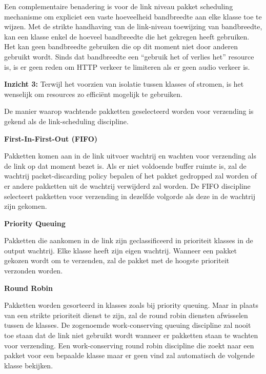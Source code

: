 \newpage

\noindent Een complementaire benadering is voor de link niveau pakket scheduling mechanisme om expliciet een vaste hoeveelheid bandbreedte aan elke klasse toe te wijzen. Met de strikte handhaving van de link-niveau toewijzing van bandbreedte, kan een klasse enkel de hoeveel bandbreedte die het gekregen heeft gebruiken. Het kan geen bandbreedte gebruiken die op dit moment niet door anderen gebruikt wordt. Sinds dat bandbreedte een “gebruik het of verlies het” resource is, is er geen reden om HTTP verkeer te limiteren als er geen audio verkeer is.

\noindent \textbf{Inzicht 3:} Terwijl het voorzien van isolatie tussen klasses of stromen, is het wenselijk om resources zo efficiënt mogelijk te gebruiken.


\noindent De manier waarop wachtende pakketten geselecteerd worden voor verzending is gekend als de link-scheduling discipline.

\noindent \textbf{First-In-First-Out (FIFO)}

\noindent Pakketten komen aan in de link uitvoer wachtrij en wachten voor verzending als de link op dat moment bezet is. Als er niet voldoende buffer ruimte is, zal de wachtrij packet-discarding policy bepalen of het pakket gedropped zal worden of er andere pakketten uit de wachtrij verwijderd zal worden.
De FIFO discipline selecteert pakketten voor verzending in dezelfde volgorde als deze in de wachtrij zijn gekomen.

\noindent \textbf{Priority Queuing}

\noindent Pakketten die aankomen in de link zijn geclassificeerd in prioriteit klasses in de output wachtrij. Elke klasse heeft zijn eigen wachtrij. Wanneer een pakket gekozen wordt om te verzenden, zal de pakket met de hoogste prioriteit verzonden worden.

\noindent \textbf{Round Robin}

\noindent Pakketten worden gesorteerd in klasses zoals bij priority queuing. Maar in plaats van een strikte prioriteit dienst te zijn, zal de round robin diensten afwisselen tussen de klasses. De zogenoemde work-conserving queuing discipline zal nooit toe staan dat de link niet gebruikt wordt wanneer er pakketten staan te wachten voor verzending. Een work-conserving round robin discipline die zoekt naar een pakket voor een bepaalde klasse maar er geen vind zal automatisch de volgende klasse bekijken.


